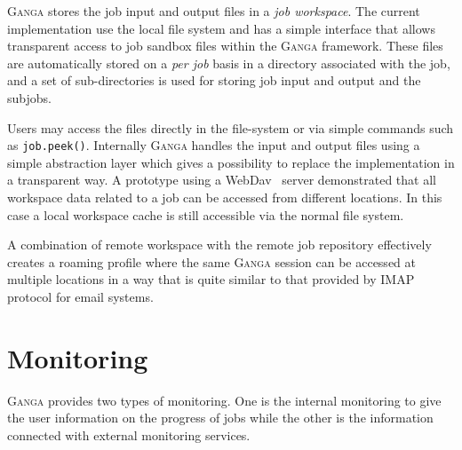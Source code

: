 \documentclass{elsart}
\def\ganga {\textsc{Ganga}\xspace}
\begin{document}
\ganga stores the job input and output files in a \emph{job workspace}. 
The current implementation use the local file system and has a simple
interface that allows transparent access to job sandbox files within the
\ganga framework. These files are automatically stored on a \emph{per job}
basis in a directory associated with the job, and a set of sub-directories is
used for storing job input and output and the subjobs.

Users may access the files directly in the file-system or via simple commands
such as \texttt{job.peek()}. Internally \ganga handles the input and output
files using a simple abstraction layer which gives a possibility to replace
the implementation in a transparent way. A prototype using a
WebDav~\cite{WebDav} server demonstrated that all workspace data related to a
job can be accessed from different locations. In this case a local workspace
cache is still accessible via the normal file system.

A combination of remote workspace with the remote job repository effectively
creates a roaming profile where the same \ganga session can be accessed at
multiple locations in a way that is quite similar to that provided by  IMAP 
protocol for email systems.

\section{Monitoring}
\label{sec:mon}
\ganga provides two types of monitoring. One is the internal monitoring to
give the user information on the progress of jobs while the other is the
information connected with external monitoring services.
\end{document}
